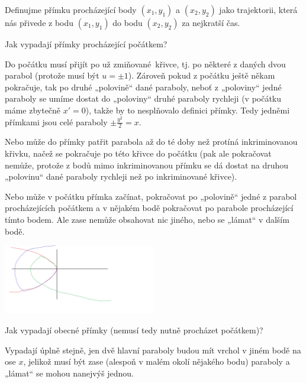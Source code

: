 \documentclass[12pt]{article}					%
\begin{document}
\pagebreak

Definujme přímku procházející body $(x_1, y_1)$ a $(x_2, y_2)$ jako trajektorii, která nás přivede z bodu $(x_1, y_1)$ do bodu $(x_2, y_2)$ za nejkratší čas.

\begin{priklad}[II]
	Jak vypadají přímky procházející počátkem?

	\begin{reseni}
		Do počátku musí přijít po už zmiňované křivce, tj. po některé z daných dvou parabol (protože musí být $u = ±1$). Zároveň pokud z počátku ještě někam pokračuje, tak po druhé „polovině“ dané paraboly, neboť z „poloviny“ jedné paraboly se umíme dostat do „poloviny“ druhé paraboly rychleji (v počátku máme zbytečně $x' = 0$), takže by to nesplňovalo definici přímky. Tedy jedněmi přímkami jsou celé paraboly $±\frac{y^2}{2} = x$.

		Nebo může do přímky patřit parabola až do té doby než protíná inkriminovanou křivku, načež se pokračuje po této křivce do počátku (pak ale pokračovat nemůže, protože z bodů mimo inkriminovanou přímku se dá dostat na druhou „polovinu“ dané paraboly rychleji než po inkriminované křivce).

		Nebo může v počátku přímka začínat, pokračovat po „polovině“ jedné z parabol procházejících počátkem a v nějakém bodě pokračovat po parabole procházející tímto bodem. Ale zase nemůže obsahovat nic jiného, nebo se „lámat“ v dalším bodě.

		\begin{center}
			\includegraphics[width=0.5\textwidth]{ODR2_DU1.png}
		\end{center}
	\end{reseni}
\end{priklad}

\begin{priklad}[III]
	Jak vypadají obecné přímky (nemusí tedy nutně procházet počátkem)?

	\begin{reseni}
		Vypadají úplně stejně, jen dvě hlavní paraboly budou mít vrchol v jiném bodě na ose $x$, jelikož musí být zase (alespoň v malém okolí nějakého bodu) paraboly a „lámat“ se mohou nanejvýš jednou.
	\end{reseni}
\end{priklad}
\end{document}
